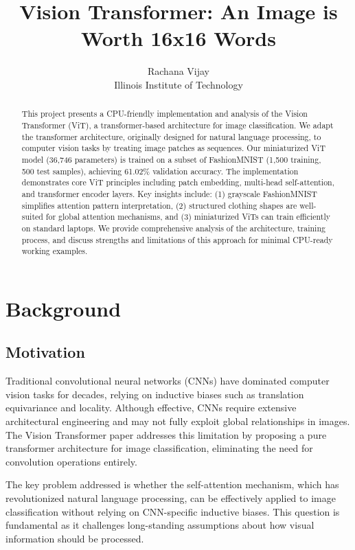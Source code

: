 \documentclass{article}
\title{Vision Transformer: An Image is Worth 16x16 Words}
\author{%
  Rachana Vijay \\
  Illinois Institute of Technology\\
}
\begin{document}
\maketitle

\begin{abstract}
This project presents a CPU-friendly implementation and analysis of the Vision Transformer (ViT), a transformer-based architecture for image classification. We adapt the transformer architecture, originally designed for natural language processing, to computer vision tasks by treating image patches as sequences. Our miniaturized ViT model (36,746 parameters) is trained on a subset of FashionMNIST (1,500 training, 500 test samples), achieving 61.02\% validation accuracy. The implementation demonstrates core ViT principles including patch embedding, multi-head self-attention, and transformer encoder layers. Key insights include: (1) grayscale FashionMNIST simplifies attention pattern interpretation, (2) structured clothing shapes are well-suited for global attention mechanisms, and (3) miniaturized ViTs can train efficiently on standard laptops. We provide comprehensive analysis of the architecture, training process, and discuss strengths and limitations of this approach for minimal CPU-ready working examples.
\end{abstract}

\section{Background}

\subsection{Motivation}

Traditional convolutional neural networks (CNNs) have dominated computer vision tasks for decades, relying on inductive biases such as translation equivariance and locality. Although effective, CNNs require extensive architectural engineering and may not fully exploit global relationships in images. The Vision Transformer paper \citep{dosovitskiy2021vit} addresses this limitation by proposing a pure transformer architecture for image classification, eliminating the need for convolution operations entirely.

The key problem addressed is whether the self-attention mechanism, which has revolutionized natural language processing, can be effectively applied to image classification without relying on CNN-specific inductive biases. This question is fundamental as it challenges long-standing assumptions about how visual information should be processed.
\end{document}
